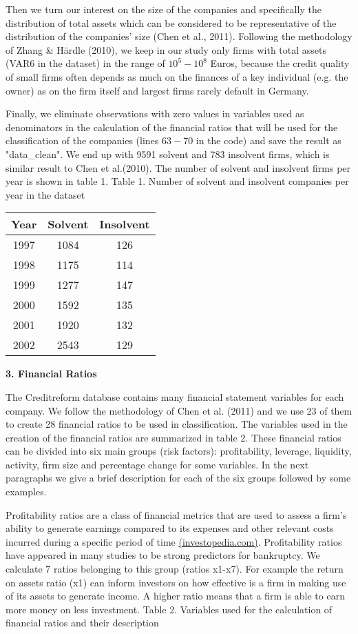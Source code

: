\documentclass[11pt]{article}
\begin{document}
Then we turn our interest on the size of the companies and specifically the distribution of total assets which can be considered to be representative of the distribution of the companies' size (Chen et al., 2011). Following the methodology of Zhang \& H{\"a}rdle (2010), we keep in our study only firms with total assets (VAR6 in the dataset) in the range of $10^5 - 10^8$ Euros, because the credit quality of small firms often depends as much on the finances of a key individual (e.g. the owner) as on the firm itself and largest firms rarely default in Germany.

Finally, we eliminate observations with zero values in variables used as denominators in the calculation of the financial ratios that will be used for the classification of the companies (lines $63-70$ in the code) and save the result as "data\_clean". We end up with 9591 solvent and 783 insolvent firms, which is similar result to Chen et al.(2010). The number of solvent and insolvent firms per year is shown in table 1.
\vskip 0.2in
Table 1. Number of solvent and insolvent companies per year in the dataset
\begin{center}
\begin{tabular}{ccc} 
\hline\hline
Year & Solvent & Insolvent\\ 
\hline
1997 & 1084 & 126 \\
1998 & 1175 & 114 \\
1999 & 1277 & 147 \\
2000 & 1592 & 135 \\
2001 & 1920 & 132 \\
2002 & 2543 & 129 \\
\hline\hline
\end{tabular}
\end{center}

\vskip 0.4in
\textbf{3. Financial Ratios}
\vskip 0.2in

The Creditreform database contains many financial statement variables for each company. We follow the methodology of Chen et al. (2011) and we use 23 of them to create 28 financial ratios to be used in classification. The variables used in the creation of the financial ratios are summarized in table 2. These financial ratios can be divided into six main groups (risk factors): profitability, leverage, liquidity, activity, firm size and percentage change for some variables. In the next paragraphs we give a brief description for each of the six groups followed by some examples.

Profitability ratios are a class of financial metrics that are used to assess a firm's ability to generate earnings compared to its expenses and other relevant costs incurred during a specific period of time \href{<https://www.investopedia.com/terms/p/profitabilityratios.asp>}{(investopedia.com)}. Profitability ratios have appeared in many studies to be strong predictors for bankruptcy.  We calculate 7 ratios belonging to this group (ratios x1-x7). For example the return on assets ratio (x1) can inform investors on how effective is a firm in making use of its assets to generate income. A higher ratio means that a firm is able to earn more money on less investment. 
\newpage
Table 2. Variables used for the calculation of financial ratios and their description
\end{document}
